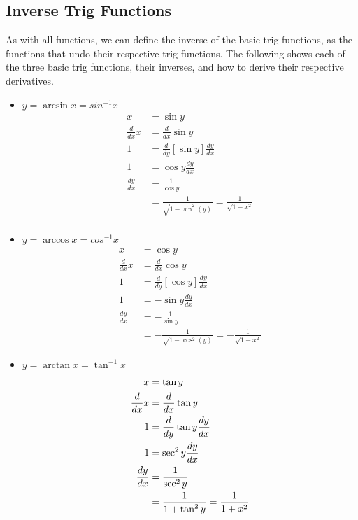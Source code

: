 \documentclass[12pt]{article}
\begin{document}
\subsection{Inverse Trig Functions}
As with all functions, we can define the inverse of the basic trig functions, as the functions that undo their respective trig functions. The following shows each of the three basic trig functions, their inverses, and how to derive their respective derivatives.

\begin{itemize}
    \item $y = \arcsin x = sin^{-1}x$
    \begin{equation}
    \begin{split}
        x &= \sin y \\
        \frac{d}{dx}x &= \frac{d}{dx} \sin y\\
        1 &= \frac{d}{dy}[\sin y]\frac{dy}{dx}\\
        1 &= \cos y \frac{dy}{dx}\\
        \frac{dy}{dx} &= \frac{1}{\cos y}\\
        &= \frac{1}{\sqrt{1-\sin^2(y)}} = \frac{1}{\sqrt{1-x^2}}\\
    \end{split}        
\end{equation}

    \item $y = \arccos x = cos^{-1}x$
    \begin{equation}
        \begin{split}
            x &= \cos y\\
            \frac{d}{dx} x &= \frac{d}{dx} \cos y\\
            1 &= \frac{d}{dy}[\cos y] \frac{dy}{dx}\\
            1 &= -\sin y \frac{dy}{dx}\\
            \frac{dy}{dx} &= -\frac{1}{\sin y}\\
            &= -\frac{1}{\sqrt{1-\cos^2(y)}} = -\frac{1}{\sqrt{1-x^2}}
        \end{split}
    \end{equation}

    \item $y = \arctan x = \tan^{-1} x$
    \begin{equation}
        \begin{split}
            x &= \tan y\\
            \frac{d}{dx} x &= \frac{d}{dx} \tan y\\
            1 &= \frac{d}{dy} \tan y \frac{dy}{dx}\\
            1 &= \sec^2 y \frac{dy}{dx}\\
            \frac{dy}{dx} &= \frac{1}{\sec^2 y}\\
            &= \frac{1}{1+\tan^2 y} = \frac{1}{1+x^2}\\
        \end{split}
    \end{equation}
\end{itemize}
\end{document}
